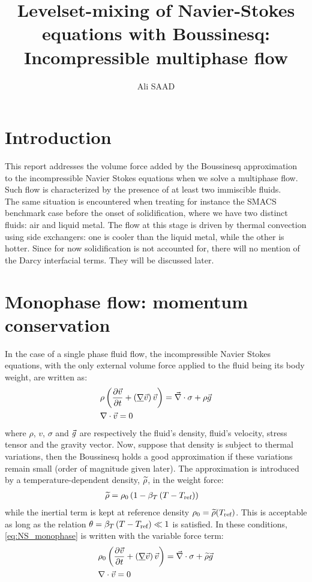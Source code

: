\documentclass[11pt,a4paper]{article}
\title{Levelset-mixing of Navier-Stokes equations with Boussinesq:\\ Incompressible multiphase flow }
\author{Ali SAAD}
\begin{document}
\maketitle
\section{Introduction}
This report addresses the volume force added by the Boussinesq approximation to the incompressible Navier Stokes equations
when we solve a multiphase flow. Such flow is characterized by the presence of at least two immiscible fluids. \\
The same situation is encountered when treating for instance the SMACS benchmark case before the onset of solidification, where we have two distinct fluids: air and liquid metal.
The flow at this stage is driven by thermal convection using side exchangers: one is cooler than the liquid metal, while the other is hotter.
Since for now solidification is not accounted for, there will no mention of the Darcy interfacial terms. They will be discussed later.
\section{Monophase flow: momentum conservation}
In the case of a single phase fluid flow, the incompressible Navier Stokes equations, with the only external volume 
force applied to the fluid being its body weight, are written as:
\begin{align}
\label{eq:NS_monophase}
& \rho \left( \frac{\partial \vec{v}}{\partial t} + \left( \underline{\nabla} \vec{v} \right) \vec{v}  \right) = \vec{\nabla} \cdot \sigma + \rho \vec{g} \\ 
& \nabla \cdot \vec{v} = 0
\end{align}
where $\rho$, $v$, $\sigma$ and $\vec{g}$ are respectively the fluid's density, fluid's velocity, stress tensor and the gravity vector.
Now, suppose that density is subject to thermal variations, then the Boussinesq holds a good approximation if these variations remain small (order of magnitude given later).
The approximation is introduced by a temperature-dependent density, $\widetilde{\rho}$, in the weight force:
\begin{align}
\label{eq:boussinesq}
\rhobouss %
          	&= \rho_0 \brac{1-\betaT \brac{T-\Tref}}
\end{align}
while the inertial term is kept at reference density $\rho_0 = \widetilde{\rho}(T_{\text{ref}})$. This is acceptable as long as the relation
$\theta = \beta_T \left( T-T_{\text{ref}} \right) \ll 1$ is satisfied.
In these conditions, \eqref{eq:NS_monophase} is written with the variable force term:
\begin{align}
\label{eq:NS_monophase_boussinesq}
& \rho_0 \left( \frac{\partial \vec{v}}{\partial t} + \left( \underline{\nabla} \vec{v} \right) \vec{v}  \right) = \vec{\nabla} \cdot \sigma + \widetilde{\rho} \vec{g} \\ 
& \nabla \cdot \vec{v} = 0
\end{align}
\end{document}
